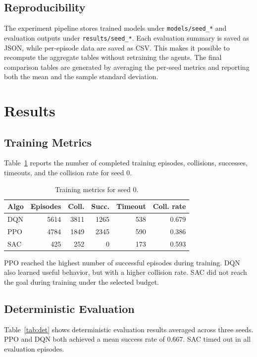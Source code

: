 \documentclass[conference]{IEEEtran}
\begin{document}
\subsection{Reproducibility}

The experiment pipeline stores trained models under \texttt{models/seed\_*}
and evaluation outputs under \texttt{results/seed\_*}. Each evaluation summary
is saved as JSON, while per-episode data are saved as CSV. This makes it
possible to recompute the aggregate tables without retraining the agents. The
final comparison tables are generated by averaging the per-seed metrics and
reporting both the mean and the sample standard deviation.

\section{Results}

\subsection{Training Metrics}

Table~\ref{tab:train} reports the number of completed training episodes,
collisions, successes, timeouts, and the collision rate for seed 0.

\begin{table}[htbp]
\caption{Training metrics for seed 0.}
\label{tab:train}
\centering
\begin{tabular}{lrrrrr}
\toprule
Algo & Episodes & Coll. & Succ. & Timeout & Coll. rate \\
\midrule
DQN & 5614 & 3811 & 1265 & 538 & 0.679 \\
PPO & 4784 & 1849 & 2345 & 590 & 0.386 \\
SAC & 425 & 252 & 0 & 173 & 0.593 \\
\bottomrule
\end{tabular}
\end{table}

PPO reached the highest number of successful episodes during training. DQN
also learned useful behavior, but with a higher collision rate. SAC did not
reach the goal during training under the selected budget.

\subsection{Deterministic Evaluation}

Table~\ref{tab:det} shows deterministic evaluation results averaged across
three seeds. PPO and DQN both achieved a mean success rate of 0.667. SAC timed
out in all evaluation episodes.
\end{document}
